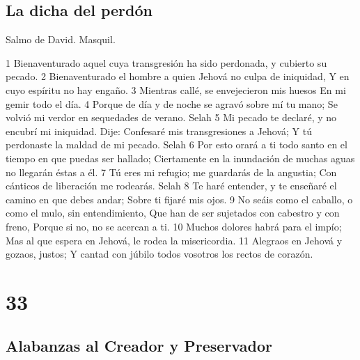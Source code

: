 \section*{La dicha del perdón}

Salmo de David. Masquil.

1 Bienaventurado aquel cuya transgresión ha sido perdonada, y cubierto su pecado.
2 Bienaventurado el hombre a quien Jehová no culpa de iniquidad,
Y en cuyo espíritu no hay engaño.
3 Mientras callé, se envejecieron mis huesos
En mi gemir todo el día.
4 Porque de día y de noche se agravó sobre mí tu mano;
Se volvió mi verdor en sequedades de verano. Selah
5 Mi pecado te declaré, y no encubrí mi iniquidad.
Dije: Confesaré mis transgresiones a Jehová;
Y tú perdonaste la maldad de mi pecado.  Selah
6 Por esto orará a ti todo santo en el tiempo en que puedas ser hallado;
Ciertamente en la inundación de muchas aguas no llegarán éstas a él.
7 Tú eres mi refugio; me guardarás de la angustia;
Con cánticos de liberación me rodearás. Selah
8 Te haré entender, y te enseñaré el camino en que debes andar;
Sobre ti fijaré mis ojos.
9 No seáis como el caballo, o como el mulo, sin entendimiento,
Que han de ser sujetados con cabestro y con freno,
Porque si no, no se acercan a ti.
10 Muchos dolores habrá para el impío;
Mas al que espera en Jehová, le rodea la misericordia.
11 Alegraos en Jehová y gozaos, justos;
Y cantad con júbilo todos vosotros los rectos de corazón.

\chapter{33}

\section*{Alabanzas al Creador y Preservador}

